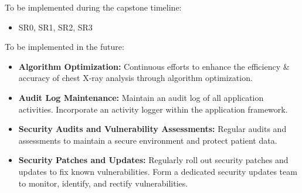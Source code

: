 \documentclass{article}
\begin{document}
To be implemented during the capstone timeline: 
\begin{itemize}
    \item SR0, SR1, SR2, SR3
\end{itemize}

To be implemented in the future: 
\begin{itemize}
    \item \textbf{Algorithm Optimization:} Continuous efforts to enhance the efficiency \& accuracy of chest X-ray analysis through algorithm optimization.
    \item \textbf{Audit Log Maintenance:} Maintain an audit log of all application activities.
    Incorporate an activity logger within the application framework.
    \item \textbf{Security Audits and Vulnerability Assessments:} Regular audits and assessments to maintain a secure environment and protect patient data.
    \item \textbf{Security Patches and Updates:} Regularly roll out security patches and updates to fix known vulnerabilities. Form a dedicated security updates team to monitor, identify, and rectify vulnerabilities.
\end{itemize}
\end{document}
